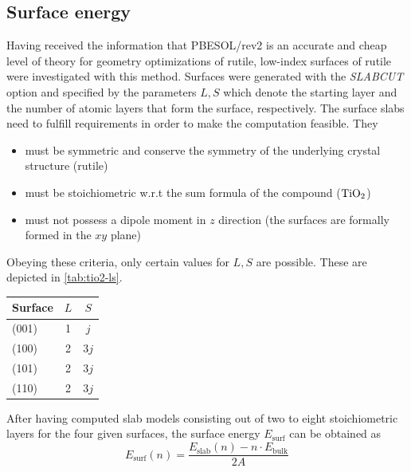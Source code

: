 \documentclass[a4paper,12pt,parskip=half]{scrartcl}
\begin{document}
\subsection{Surface energy}
%
Having received the information that PBESOL/rev2 is an accurate and cheap level of theory for geometry optimizations of rutile, low-index surfaces of rutile were investigated with this method. Surfaces were generated with the \textit{SLABCUT} option and specified by the parameters $ L, S $ which denote the starting layer and the number of atomic layers that form the surface, respectively. The surface slabs need to fulfill requirements in order to make the computation feasible. They
%
\begin{itemize}
	\item must be symmetric and conserve the symmetry of the underlying crystal structure (rutile) 
	\item must be stoichiometric w.r.t the sum formula of the compound ($ \ce{TiO2} $) 
	\item must not possess a dipole moment in $ z $ direction (the surfaces are formally formed in the $ xy $ plane)
\end{itemize}
%
Obeying these criteria, only certain values for $ L, S $ are possible. These are depicted in \autoref{tab:tio2-ls}.
%
\begin{table}
	\centering
	\label{tab:tio2-ls}
	\begin{tabular}{lcc}
		\toprule
		Surface & $ L $ & $ S $ \\
		\midrule
		(001)     & 1 & $j$  \\
		(100)     & 2 & $3j$    \\
		(101)     & 2 & $3j$    \\
		(110)     & 2 & $3j$     \\
		\bottomrule
	\end{tabular}
\end{table}
%
After having computed slab models consisting out of two to eight stoichiometric layers for the four given surfaces, the surface energy $ E_\mathrm{surf} $ can be obtained as
%
\begin{equation}
	E_\mathrm{surf} (n) = \frac{E_\mathrm{slab}(n) - n \cdot E_\mathrm{bulk}}{2A}
\end{equation}
%
\end{document}
